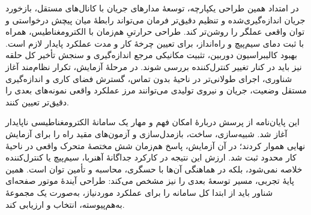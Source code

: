 در امتداد همین طراحی یکپارچه، توسعهٔ مدارهای جریان با کانال‌های مستقل، بازخورد جریان اندازه‌گیری‌شده و تنظیم دقیق‌تر فرمان می‌تواند رابطهٔ میان پیچش درخواستی و توان واقعی عملگر را روشن‌تر کند. طراحی حرارتیِ هم‌زمان با الکترومغناطیس، همراه با ثبت دمای سیم‌پیچ و راه‌انداز، برای تعیین چرخهٔ کار و مدت عملکرد پایدار لازم است. بهبود کالیبراسیون دوربین، تثبیت مکانیکی مرجع اندازه‌گیری و سنجش تأخیر کل حلقه نیز باید در کنار تغییر کنترل‌کننده بررسی شوند. در مرحلهٔ آزمایش، تکرار نظام‌مند آغاز شناوری، اجرای طولانی‌تر در ناحیهٔ بدون تماس، گسترش فضای کاری و اندازه‌گیری مستقل وضعیت، جریان و نیروی تولیدی می‌توانند مرز عملکرد واقعی نمونه‌های بعدی را دقیق‌تر تعیین کنند.

این پایان‌نامه از پرسش دربارهٔ امکان فهم و مهار یک سامانهٔ الکترومغناطیسی ناپایدار آغاز شد. شبیه‌سازی، ساخت، بازمدل‌سازی و آزمون‌های مقید راه را برای آزمایش نهایی هموار کردند؛ در آن آزمایش، پاسخ هم‌زمان شش مختصهٔ متحرک واقعی در ناحیهٔ کار محدود ثبت شد. ارزش این نتیجه در کارکرد جداگانهٔ آهنربا، سیم‌پیچ یا کنترل‌کننده خلاصه نمی‌شود، بلکه در هماهنگی آن‌ها با حسگری، محاسبه و تأمین توان است. همین پایهٔ تجربی، مسیر توسعهٔ بعدی را نیز مشخص می‌کند: طراحی آیندهٔ موتور صفحه‌ای شناور باید از ابتدا کل سامانه را برای عملکرد موردنیاز، به‌صورت یک مجموعهٔ به‌هم‌پیوسته، انتخاب و ارزیابی کند.
